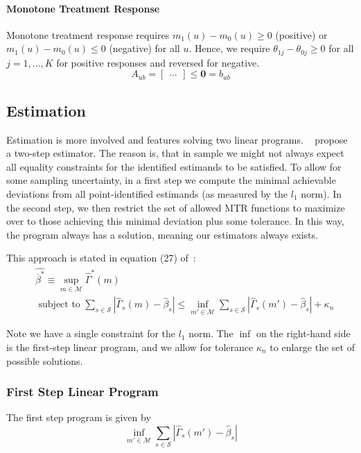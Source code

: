 \documentclass[12pt,a4paper,english]{article} %
\numberwithin{equation}{section}
\theoremstyle{definition}
\theoremstyle{remark}
\theoremstyle{plain}
\begin{document}
\paragraph{Monotone Treatment Response}
Monotone treatment response requires $m_1(u) - m_0(u) \geq 0$ (positive) or $m_1(u) - m_0(u) \leq 0$ (negative) for all $u$.
Hence, we require $\theta_{1j} - \theta_{0j} \geq 0$ for all $j=1,\ldots,K$ for positive responses and reversed for negative.
\begin{equation*}
  A_{ub} =
  \begin{bmatrix}
    \ldots
  \end{bmatrix} \leq \mathbf{0} = b_{ub}
\end{equation*}

\subsection{Estimation}
Estimation is more involved and features solving two linear programs.
~\cite{mogstad2018using} propose a two-step estimator.
The reason is, that in sample we might not always expect all equality constraints for the identified estimands to be satisfied.
To allow for some sampling uncertainty, in a first step we compute the minimal achievable deviations from all point-identified estimands (as measured by the $l_1$ norm).
In the second step, we then restrict the set of allowed MTR functions to maximize over to those achieving this minimal deviation plus some tolerance.
In this way, the program always has a solution, meaning our estimators always exists.

This approach is stated in equation (27) of~\cite{mogstad2018using}:
\begin{align}
  & \hat{\overline{\beta}^*} \equiv \sup_{m\in \mathcal{M}}\hat{\Gamma}^*(m) \\
  & \text{ subject to } \sum_{s\in\mathcal{S}}|\hat{\Gamma}_s(m) - \hat{\beta}_s| \leq \inf_{m'\in \mathcal{M}} \sum_{s\in\mathcal{S}}|\hat{\Gamma}_s(m') - \hat{\beta}_s| + \kappa_n
\end{align}

Note we have a single constraint for the $l_1$ norm.
The $\inf$ on the right-hand side is the first-step linear program, and we allow for tolerance $\kappa_n$ to enlarge the set of possible solutions.

\subsubsection{First Step Linear Program}
The first step program is given by
\begin{equation*}
  \inf_{m'\in \mathcal{M}} \sum_{s\in\mathcal{S}}|\hat{\Gamma}_s(m') - \hat{\beta}_s|
\end{equation*}
\end{document}
